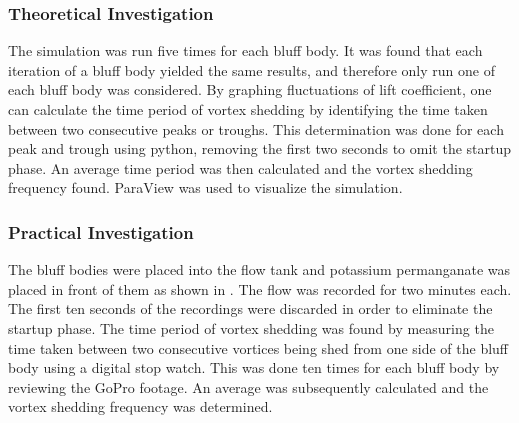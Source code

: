 \subsubsection{Theoretical Investigation}
The simulation was run five times for each bluff body. It was found that each iteration of a bluff body yielded the same results, and therefore only run one of each bluff body was considered. By graphing fluctuations of lift coefficient, one can calculate the time period of vortex shedding by identifying the time taken between two consecutive peaks or troughs. This determination was done for each peak and trough using python, removing the first two seconds to omit the startup phase. An average time period was then calculated and the vortex shedding frequency found. ParaView was used to visualize the simulation.

\subsubsection{Practical Investigation}
The bluff bodies were placed into the flow tank and potassium permanganate was placed in front of them as shown in . The flow was recorded for two minutes each. The first ten seconds of the recordings were discarded in order to eliminate the startup phase. The time period of vortex shedding was found by measuring the time taken between two consecutive vortices being shed from one side of the bluff body using a digital stop watch. This was done ten times for each bluff body by reviewing the GoPro footage. An average was subsequently calculated and the vortex shedding frequency was determined.